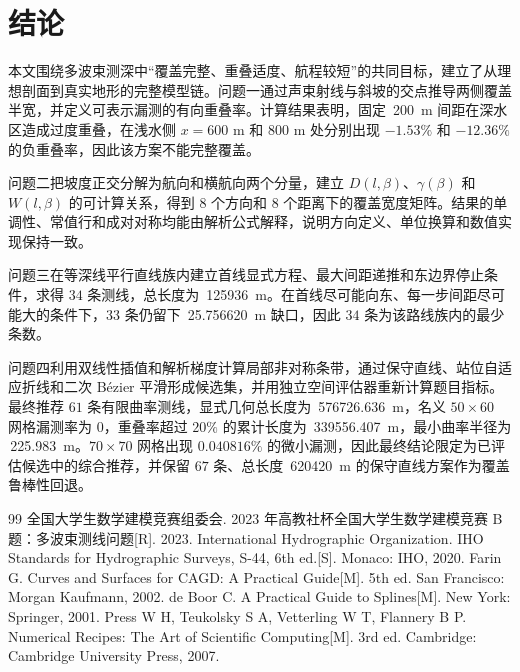 \section{结论}
本文围绕多波束测深中“覆盖完整、重叠适度、航程较短”的共同目标，建立了从理想剖面到真实地形的完整模型链。问题一通过声束射线与斜坡的交点推导两侧覆盖半宽，并定义可表示漏测的有向重叠率。计算结果表明，固定 \,\SI{200}{m} 间距在深水区造成过度重叠，在浅水侧 $x=600$ m 和 $800$ m 处分别出现 $-1.53\%$ 和 $-12.36\%$ 的负重叠率，因此该方案不能完整覆盖。

问题二把坡度正交分解为航向和横航向两个分量，建立 $D(l,\beta)$、$\gamma(\beta)$ 和 $W(l,\beta)$ 的可计算关系，得到 $8$ 个方向和 $8$ 个距离下的覆盖宽度矩阵。结果的单调性、常值行和成对对称均能由解析公式解释，说明方向定义、单位换算和数值实现保持一致。

问题三在等深线平行直线族内建立首线显式方程、最大间距递推和东边界停止条件，求得 $34$ 条测线，总长度为 \,\SI{125936}{m}。在首线尽可能向东、每一步间距尽可能大的条件下，$33$ 条仍留下 \,\SI{25.756620}{m} 缺口，因此 $34$ 条为该路线族内的最少条数。

问题四利用双线性插值和解析梯度计算局部非对称条带，通过保守直线、站位自适应折线和二次 Bézier 平滑形成候选集，并用独立空间评估器重新计算题目指标。最终推荐 $61$ 条有限曲率测线，显式几何总长度为 \,\SI{576726.636}{m}，名义 $50\times60$ 网格漏测率为 $0$，重叠率超过 $20\%$ 的累计长度为 \,\SI{339556.407}{m}，最小曲率半径为 \,\SI{225.983}{m}。$70\times70$ 网格出现 $0.040816\%$ 的微小漏测，因此最终结论限定为已评估候选中的综合推荐，并保留 $67$ 条、总长度 \,\SI{620420}{m} 的保守直线方案作为覆盖鲁棒性回退。

\begin{thebibliography}{99}
 全国大学生数学建模竞赛组委会. 2023 年高教社杯全国大学生数学建模竞赛 B 题：多波束测线问题[R]. 2023.
 International Hydrographic Organization. IHO Standards for Hydrographic Surveys, S-44, 6th ed.[S]. Monaco: IHO, 2020.
 Farin G. Curves and Surfaces for CAGD: A Practical Guide[M]. 5th ed. San Francisco: Morgan Kaufmann, 2002.
 de Boor C. A Practical Guide to Splines[M]. New York: Springer, 2001.
 Press W H, Teukolsky S A, Vetterling W T, Flannery B P. Numerical Recipes: The Art of Scientific Computing[M]. 3rd ed. Cambridge: Cambridge University Press, 2007.
\end{thebibliography}

\clearpage
